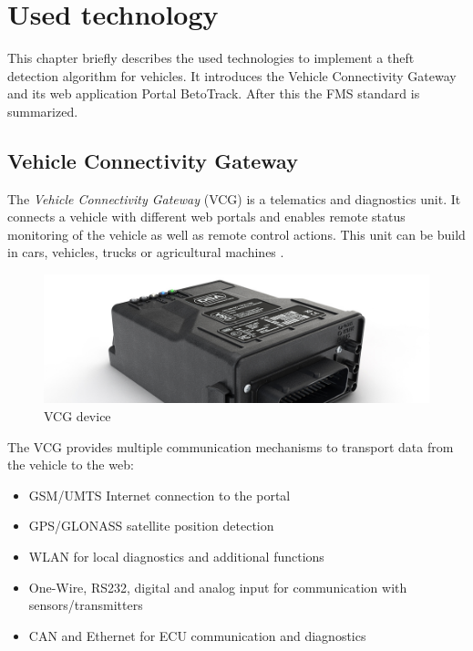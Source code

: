 \chapter{Used technology}

This chapter briefly describes the used technologies to implement a theft detection algorithm for vehicles. It introduces the Vehicle Connectivity Gateway and its web application Portal BetoTrack. After this the FMS standard is summarized.

\section{Vehicle Connectivity Gateway}
\label{sec::vcg}

The \textit{Vehicle Connectivity Gateway} (VCG) is a telematics and diagnostics unit. It connects a vehicle with different web portals and enables remote status monitoring of the vehicle as well as remote control actions. This unit can be build in cars, vehicles, trucks or agricultural machines \cite{VCG}.  

\begin{figure}[h]
    \includegraphics[width=1.0\textwidth]{src/pic/vcg_960x320px.jpg}
    \caption{VCG device \cite{DSA}}
\end{figure}

The VCG provides multiple communication mechanisms to transport data from the vehicle to the web:

\begin{itemize}
    \item GSM/UMTS Internet connection to the portal
    \item GPS/GLONASS satellite position detection
    \item WLAN for local diagnostics and additional functions
    \item One-Wire, RS232, digital and analog input for communication with sensors/transmitters
    \item CAN and Ethernet for ECU communication and diagnostics
\end{itemize}

